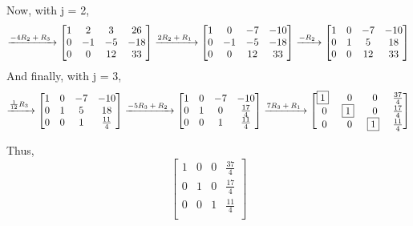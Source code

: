 \documentclass[12pt]{article}
\newcommand{\pivot} {$\boxed{1}$~}
\begin{document}
Now, with j = 2,
\[
\xrightarrow[]{\text{$-4R\textsubscript{2} + R\textsubscript{3}$~}}
    \begin{bmatrix}
    	1 & 2 & 3 & 26 \\
        0 & -1 & -5 & -18 \\
        0 & 0 & 12 & 33\\
	\end{bmatrix}
\xrightarrow[]{\text{$2R\textsubscript{2} + R\textsubscript{1}$~}}
    \begin{bmatrix}
    	1 & 0 & -7 & -10 \\
        0 & -1 & -5 & -18 \\
        0 & 0 & 12 & 33\\
	\end{bmatrix}
\xrightarrow[]{\text{$-R\textsubscript{2}$~}}
    \begin{bmatrix}
    	1 & 0 & -7 & -10 \\
        0 & 1 & 5 & 18 \\
        0 & 0 & 12 & 33\\
	\end{bmatrix}
\]
And finally, with j = 3,
\[
\xrightarrow[]{\text{$\frac{1}{12}R\textsubscript{3} $~}}
    \begin{bmatrix}
    	1 & 0 & -7 & -10 \\
        0 & 1 & 5 & 18 \\
        0 & 0 & 1 & \frac{11}{4}\\
	\end{bmatrix}
\xrightarrow[]{\text{$-5R\textsubscript{3} + R\textsubscript{2}$~}}
    \begin{bmatrix}
    	1 & 0 & -7 & -10 \\
        0 & 1 & 0 & \frac{17}{4} \\
        0 & 0 & 1 & \frac{11}{4}\\
	\end{bmatrix}
\xrightarrow[]{\text{$7R\textsubscript{3} + R\textsubscript{1}$~}}
    \begin{bmatrix}
    	\pivot & 0 & 0 & \frac{37}{4} \\
      0 & \pivot & 0 & \frac{17}{4} \\
      0 & 0 & \pivot & \frac{11}{4}\\
	\end{bmatrix}
\]

\bigskip
Thus,
\[
\begin{bmatrix}
    	1 & 0 & 0 & \frac{37}{4} \\
        0 & 1 & 0 & \frac{17}{4} \\
        0 & 0 & 1 & \frac{11}{4}\\
	\end{bmatrix}
\]
\end{document}
